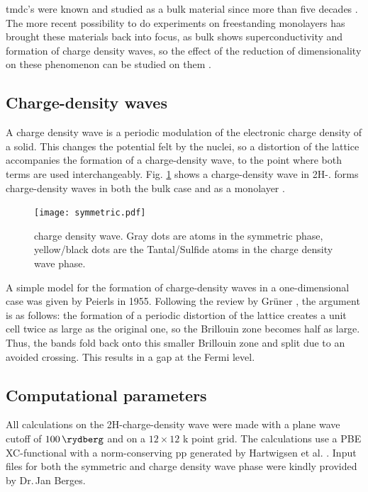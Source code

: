 \documentclass[main.tex]{subfiles}
\begin{document}
\acrshort{tmdc}'s were known and studied as a bulk material since more than five decades \cite{wilson_transition_1969}.
The more recent possibility to do experiments on freestanding monolayers \cite{novoselov_two-dimensional_2005} has brought these materials back into focus,  as bulk \TaS shows superconductivity and formation of charge density waves, so the effect of the reduction of dimensionality on these phenomenon can be studied on them \cite{navarro-moratalla_enhanced_2016}.

\subsection{Charge-density waves}

A charge density wave is a periodic modulation of the electronic charge density of a solid.
This changes the potential felt by the nuclei, so a distortion of the lattice accompanies the formation of a charge-density wave, to the point where both terms are used interchangeably.
Fig. \ref{fig:tas2_cdw_structure} shows a charge-density wave in 2H-\TaS.
\TaS forms charge-density waves in both the bulk case \cite{wilson_charge-density_1974} and as a monolayer \cite{hall_environmental_2019}.

\begin{figure}[ht!]
    \centering
    \texttt{[image: symmetric.pdf]}
    \label{fig:tas2_cdw_structure}
    \caption{\TaS charge density wave. Gray dots are atoms in the symmetric phase, yellow/black dots are the Tantal/Sulfide atoms in the charge density wave phase.}
\end{figure}

A simple model for the formation of charge-density waves in a one-dimensional case was given by Peierls in 1955.
Following the review by Grüner \cite{gruner_dynamics_1988}, the argument is as follows: 
the formation of a periodic distortion of the lattice creates a unit cell twice as large as the original one, so the Brillouin zone becomes half as large.
Thus, the bands fold back onto this smaller Brillouin zone and split due to an avoided crossing.
This results in a gap at the Fermi level.

\subsection{Computational parameters}

All calculations on the 2H-\TaS charge-density wave were made with a plane wave cutoff of \(\SI{100}{\rydberg}\) and on a \(12\times12\) k point grid.
The calculations use a PBE XC-functional with a norm-conserving \acrshort{pp} generated by Hartwigsen et al. \cite{hartwigsen_relativistic_1998}.
Input files for both the symmetric and charge density wave phase were kindly provided by Dr.\,Jan Berges.
\end{document}
